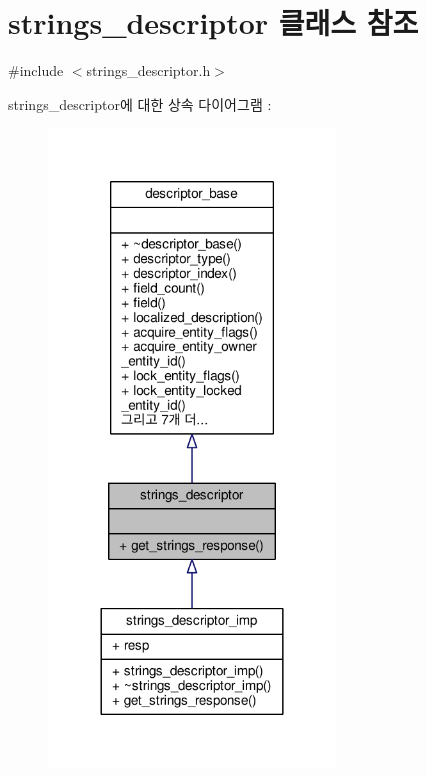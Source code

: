 \hypertarget{classavdecc__lib_1_1strings__descriptor}{}\section{strings\+\_\+descriptor 클래스 참조}
\label{classavdecc__lib_1_1strings__descriptor}


{\ttfamily \#include $<$strings\+\_\+descriptor.\+h$>$}



strings\+\_\+descriptor에 대한 상속 다이어그램 \+: 
\nopagebreak
\begin{figure}[H]
\begin{center}
\leavevmode
\includegraphics[width=216pt]{classavdecc__lib_1_1strings__descriptor__inherit__graph}
\end{center}
\end{figure}


